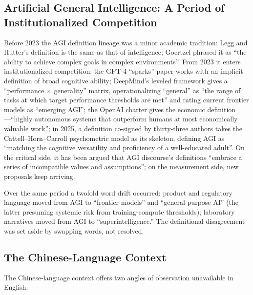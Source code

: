 \documentclass[10pt]{article}
\begin{document}
\subsection{Artificial General Intelligence: A Period of Institutionalized Competition}

Before 2023 the AGI definition lineage was a minor academic tradition: Legg and Hutter's definition is the same as that of intelligence\cite{legg2007universal}; Goertzel phrased it as ``the ability to achieve complex goals in complex environments''\cite{goertzel2014agi}. From 2023 it enters institutionalized competition: the GPT-4 ``sparks'' paper works with an implicit definition of broad cognitive ability\cite{bubeck2023sparks}; DeepMind's leveled framework gives a ``performance $\times$ generality'' matrix, operationalizing ``general'' as ``the range of tasks at which target performance thresholds are met'' and rating current frontier models as ``emerging AGI''\cite{morris2023levels}; the OpenAI charter gives the economic definition---``highly autonomous systems that outperform humans at most economically valuable work''\cite{openai2018charter}; in 2025, a definition co-signed by thirty-three authors takes the Cattell--Horn--Carroll psychometric model as its skeleton, defining AGI as ``matching the cognitive versatility and proficiency of a well-educated adult''\cite{hendrycks2025definition}. On the critical side, it has been argued that AGI discourse's definitions ``embrace a series of incompatible values and assumptions''\cite{blili2024unsocial,blili2025stop}; on the measurement side, new proposals keep arriving\cite{xu2024meant,dhar2025generality,gignac2024defining}.

Over the same period a twofold word drift occurred: product and regulatory language moved from AGI to ``frontier models'' and ``general-purpose AI'' (the latter presuming systemic risk from training-compute thresholds); laboratory narratives moved from AGI to ``superintelligence.'' The definitional disagreement was set aside by swapping words, not resolved.

\subsection{The Chinese-Language Context}\label{sec:cn}

The Chinese-language context offers two angles of observation unavailable in English.
\end{document}
